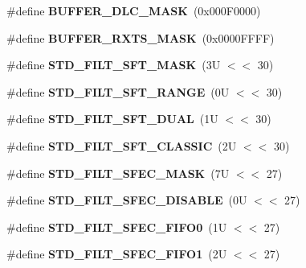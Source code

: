 \begin{DoxyCompactItemize}
\#define {\bfseries B\+U\+F\+F\+E\+R\+\_\+\+D\+L\+C\+\_\+\+M\+A\+SK}~(0x000\+F0000)
\item 
\mbox{\label{group__can__module_ga54820b4b5c8e500cd046cb14e2571570}} 
\#define {\bfseries B\+U\+F\+F\+E\+R\+\_\+\+R\+X\+T\+S\+\_\+\+M\+A\+SK}~(0x0000\+F\+F\+F\+F)
\item 
\mbox{\label{group__can__module_ga9444a38731c88707cc3583d5dcb513fb}} 
\#define {\bfseries S\+T\+D\+\_\+\+F\+I\+L\+T\+\_\+\+S\+F\+T\+\_\+\+M\+A\+SK}~(3\+U $<$$<$ 30)
\item 
\mbox{\label{group__can__module_ga2da6f9a68c66111dd476d8d4f3b2c095}} 
\#define {\bfseries S\+T\+D\+\_\+\+F\+I\+L\+T\+\_\+\+S\+F\+T\+\_\+\+R\+A\+N\+GE}~(0\+U $<$$<$ 30)
\item 
\mbox{\label{group__can__module_ga680e9bddaeb8f9d4fcda9acd642bdab2}} 
\#define {\bfseries S\+T\+D\+\_\+\+F\+I\+L\+T\+\_\+\+S\+F\+T\+\_\+\+D\+U\+AL}~(1\+U $<$$<$ 30)
\item 
\mbox{\label{group__can__module_ga25626891e7ac467da0e2ef560d4792e7}} 
\#define {\bfseries S\+T\+D\+\_\+\+F\+I\+L\+T\+\_\+\+S\+F\+T\+\_\+\+C\+L\+A\+S\+S\+IC}~(2\+U $<$$<$ 30)
\item 
\mbox{\label{group__can__module_gaa0ac0cd4f3b350033ae3d169ec5d9b9b}} 
\#define {\bfseries S\+T\+D\+\_\+\+F\+I\+L\+T\+\_\+\+S\+F\+E\+C\+\_\+\+M\+A\+SK}~(7\+U $<$$<$ 27)
\item 
\mbox{\label{group__can__module_ga03460e99e2a37b428d78250dfbf8acfa}} 
\#define {\bfseries S\+T\+D\+\_\+\+F\+I\+L\+T\+\_\+\+S\+F\+E\+C\+\_\+\+D\+I\+S\+A\+B\+LE}~(0\+U $<$$<$ 27)
\item 
\mbox{\label{group__can__module_ga6c20ca69a43b7860cc399ea36450ae5e}} 
\#define {\bfseries S\+T\+D\+\_\+\+F\+I\+L\+T\+\_\+\+S\+F\+E\+C\+\_\+\+F\+I\+F\+O0}~(1\+U $<$$<$ 27)
\item 
\mbox{\label{group__can__module_ga7e580b8169351e22279b786d5b169de2}} 
\#define {\bfseries S\+T\+D\+\_\+\+F\+I\+L\+T\+\_\+\+S\+F\+E\+C\+\_\+\+F\+I\+F\+O1}~(2\+U $<$$<$ 27)

\end{DoxyCompactItemize}
